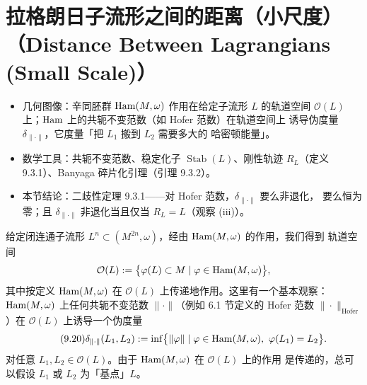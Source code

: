 
\section{拉格朗日子流形之间的距离（小尺度）
（Distance Between Lagrangians (Small Scale)）}

\begin{keytakeaways}
\begin{itemize}
  \item 几何图像：辛同胚群 $\operatorname{Ham}(M,\omega)$ 作用在给定子流形 $L$ 的轨道空间
        $\mathcal O(L)$ 上；$\operatorname{Ham}$ 上的共轭不变范数（如 Hofer 范数）在轨道空间上
        诱导伪度量 $\delta_{\|\cdot\|}$，它度量「把 $L_1$ 搬到 $L_2$ 需要多大的
        哈密顿能量」。
  \item 数学工具：共轭不变范数、稳定化子 $\operatorname{Stab}(L)$、刚性轨迹
        $R_L$（定义 9.3.1）、Banyaga 碎片化引理（引理 9.3.2）。
  \item 本节结论：二歧性定理 9.3.1——对 Hofer 范数，$\delta_{\|\cdot\|}$ 要么非退化，
        要么恒为零；且 $\delta_{\|\cdot\|}$ 非退化当且仅当 $R_L=L$（观察 (iii)）。
\end{itemize}
\end{keytakeaways}

给定闭连通子流形 $L^n\subset(M^{2n},\omega)$，经由 $\operatorname{Ham}(M,\omega)$ 的作用，我们得到
轨道空间
\begin{equation*}
  \mathcal O(L):=\bigl\{\varphi(L)\subset M\mid\varphi\in\operatorname{Ham}(M,\omega)\bigr\},
\end{equation*}
其中按定义 $\operatorname{Ham}(M,\omega)$ 在 $\mathcal O(L)$ 上传递地作用。这里有一个基本观察：
$\operatorname{Ham}(M,\omega)$ 上任何共轭不变范数 $\|\cdot\|$（例如 6.1 节定义的 Hofer 范数
$\|\cdot\|_{\mathrm{Hofer}}$）在 $\mathcal O(L)$ 上诱导一个伪度量
\begin{equation}\tag{9.20}
  \delta_{\|\cdot\|}(L_1,L_2)
  :=\inf\bigl\{\|\varphi\|\mid\varphi\in\Ham(M,\omega),\ \varphi(L_1)=L_2\bigr\}.
\end{equation}
对任意 $L_1,L_2\in\mathcal O(L)$。由于 $\operatorname{Ham}(M,\omega)$ 在 $\mathcal O(L)$ 上的作用
是传递的，总可以假设 $L_1$ 或 $L_2$ 为「基点」$L$。

